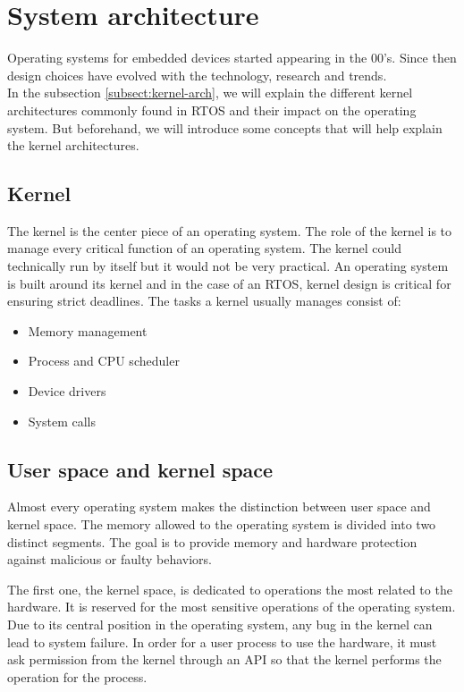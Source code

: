 \section{System architecture}

Operating systems for embedded devices started appearing in the 00's.
Since then design choices have evolved with the technology, research and trends.
\\
In the subsection \ref{subsect:kernel-arch}, we will explain the different kernel architectures commonly found in RTOS and their impact on the operating system.
But beforehand, we will introduce some concepts that will help explain the kernel architectures.

\subsection{Kernel}
The kernel is the center piece of an operating system.
The role of the kernel is to manage every critical function of an operating system.
The kernel could technically run by itself but it would not be very practical.
An operating system is built around its kernel and in the case of an RTOS, kernel design is critical for ensuring strict deadlines.
The tasks a kernel usually manages consist of:
\begin{itemize}
    \item Memory management
    \item Process and CPU scheduler
    \item Device drivers
    \item System calls
\end{itemize}

\subsection{User space and kernel space}
Almost every operating system makes the distinction between user space and kernel space.
The memory allowed to the operating system is divided into two distinct segments.
The goal is to provide memory and hardware protection against malicious or faulty behaviors.

The first one, the kernel space, is dedicated to operations the most related to the hardware.
It is reserved for the most sensitive operations of the operating system.
Due to its central position in the operating system, any bug in the kernel can lead to system failure.
In order for a user process to use the hardware, it must ask permission from the kernel through an API so that the kernel performs the operation for the process.

